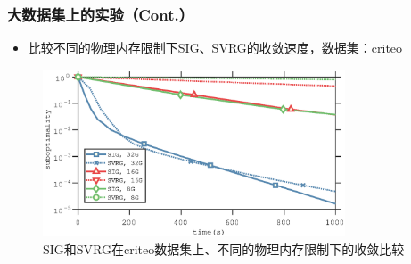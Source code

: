   \frame
  {
    \frametitle{大数据集上的实验（Cont.）}
    \footnotesize
    \begin{itemize}
        \item 比较不同的物理内存限制下SIG、SVRG的收敛速度，数据集：criteo
    \end{itemize}

    \vspace*{-0.5cm}
    \begin{figure}
        \includegraphics[trim={0cm 0 0 0cm},clip,width=0.8\textwidth]{data/img/figure6}
        \caption{SIG和SVRG在criteo数据集上、不同的物理内存限制下的收敛比较}
    \end{figure}

  }
